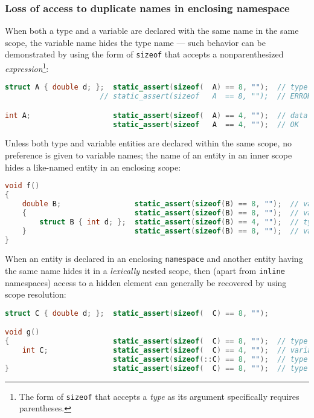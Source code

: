 \subsubsection[Loss of access to duplicate names in enclosing namespace]{Loss of access to duplicate names in enclosing namespace}\label{loss-of-access-to-duplicate-names-in-enclosing-namespace}

When both a type and a variable are declared with the same name in the
same scope, the variable name hides the type name --- such behavior can
be demonstrated by using the form of \texttt{sizeof} that accepts a
nonparenthesized \emph{expression}{\cprotect\footnote{The form of
\texttt{sizeof} that accepts a \emph{type} as its argument
  specifically requires parentheses.}}:

\begin{lstlisting}[language=C++]
struct A { double d; };  static_assert(sizeof(  A) == 8, "");  // type
                      // static_assert(sizeof   A  == 8, "");  // ERROR!

int A;                   static_assert(sizeof(  A) == 4, "");  // data
                         static_assert(sizeof   A  == 4, "");  // OK
\end{lstlisting}
    
\noindent Unless both type and variable entities are declared within the same
scope, no preference is given to variable names; the name of an entity
in an inner scope hides a like-named entity in an enclosing scope:

\begin{lstlisting}[language=C++]
void f()
{
    double B;                 static_assert(sizeof(B) == 8, "");  // variable
    {                         static_assert(sizeof(B) == 8, "");  // variable
        struct B { int d; };  static_assert(sizeof(B) == 4, "");  // type
    }                         static_assert(sizeof(B) == 8, "");  // variable
}
\end{lstlisting}
    
\noindent When an entity is declared in an enclosing \texttt{namespace} and
another entity having the same name hides it in a \emph{lexically}
nested scope, then (apart from \texttt{inline} namespaces) access to a
hidden element can generally be recovered by using scope resolution:

\begin{lstlisting}[language=C++]
struct C { double d; };  static_assert(sizeof(  C) == 8, "");

void g()
{                        static_assert(sizeof(  C) == 8, "");  // type
    int C;               static_assert(sizeof(  C) == 4, "");  // variable
                         static_assert(sizeof(::C) == 8, "");  // type
}                        static_assert(sizeof(  C) == 8, "");  // type
\end{lstlisting}
    
